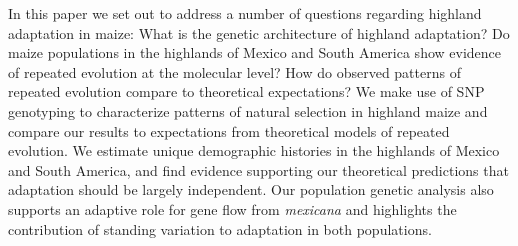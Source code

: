 In this paper we set out to address a number of questions regarding highland adaptation in maize: 
What is the genetic architecture of highland adaptation? 
Do maize populations in the highlands of Mexico and South America show evidence of repeated evolution at the molecular level? 
How do observed patterns of repeated evolution compare to theoretical expectations?
We make use of SNP genotyping to characterize patterns of natural selection in highland maize and compare our results to expectations from theoretical models of repeated evolution.  
We estimate unique demographic histories in the highlands of Mexico and South America, and find evidence supporting our theoretical predictions that adaptation should be largely independent. 
Our population genetic analysis also supports an adaptive role for gene flow from \emph{mexicana} and highlights the contribution of standing variation to adaptation in both populations.